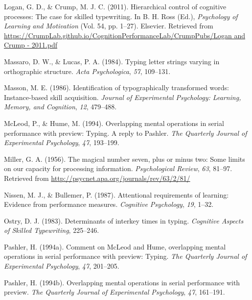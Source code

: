\documentclass[,man,floatsintext]{apa6}
\begin{document}
\leavevmode\hypertarget{ref-logan_hierarchical_2011}{}%
Logan, G. D., \& Crump, M. J. C. (2011). Hierarchical control of cognitive processes: The case for skilled typewriting. In B. H. Ross (Ed.), \emph{Psychology of Learning and Motivation} (Vol. 54, pp. 1--27). Elsevier. Retrieved from \href{https://CrumpLab.github.io/CognitionPerformanceLab/CrumpPubs/Logan\%20and\%20Crump\%20-\%202011.pdf}{https://CrumpLab.github.io/CognitionPerformanceLab/CrumpPubs/Logan and Crump - 2011.pdf}

\leavevmode\hypertarget{ref-massaro_typing_1984}{}%
Massaro, D. W., \& Lucas, P. A. (1984). Typing letter strings varying in orthographic structure. \emph{Acta Psychologica}, \emph{57}, 109--131.

\leavevmode\hypertarget{ref-MassonIdentificationtypographicallytransformed1986}{}%
Masson, M. E. (1986). Identification of typographically transformed words: Instance-based skill acquisition. \emph{Journal of Experimental Psychology: Learning, Memory, and Cognition}, \emph{12}, 479--488.

\leavevmode\hypertarget{ref-mcleod_overlapping_1994}{}%
McLeod, P., \& Hume, M. (1994). Overlapping mental operations in serial performance with preview: Typing. A reply to Pashler. \emph{The Quarterly Journal of Experimental Psychology}, \emph{47}, 193--199.

\leavevmode\hypertarget{ref-miller_magical_1956}{}%
Miller, G. A. (1956). The magical number seven, plus or minus two: Some limits on our capacity for processing information. \emph{Psychological Review}, \emph{63}, 81--97. Retrieved from \url{http://psycnet.apa.org/journals/rev/63/2/81/}

\leavevmode\hypertarget{ref-NissenAttentionalrequirementslearning1987}{}%
Nissen, M. J., \& Bullemer, P. (1987). Attentional requirements of learning: Evidence from performance measures. \emph{Cognitive Psychology}, \emph{19}, 1--32.

\leavevmode\hypertarget{ref-OstryDeterminantsinterkeytimes1983}{}%
Ostry, D. J. (1983). Determinants of interkey times in typing. \emph{Cognitive Aspects of Skilled Typewriting}, 225--246.

\leavevmode\hypertarget{ref-pashler_comment_1994}{}%
Pashler, H. (1994a). Comment on McLeod and Hume, overlapping mental operations in serial performance with preview: Typing. \emph{The Quarterly Journal of Experimental Psychology}, \emph{47}, 201--205.

\leavevmode\hypertarget{ref-pashler_overlapping_1994}{}%
Pashler, H. (1994b). Overlapping mental operations in serial performance with preview. \emph{The Quarterly Journal of Experimental Psychology}, \emph{47}, 161--191.
\end{document}
